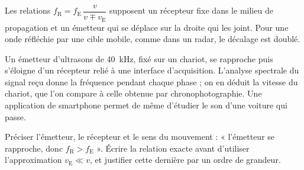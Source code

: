 \begin{attention}
Les relations $f_\mathrm{R}=f_\mathrm{E}\,\dfrac{v}{v\mp v_\mathrm{E}}$ supposent un récepteur fixe dans le milieu de propagation et un
émetteur qui se déplace sur la droite qui les joint. Pour une onde réfléchie par une cible mobile, comme dans un radar,
le décalage est doublé.
\end{attention}
\begin{experience}
Un émetteur d'ultrasons de \qty{40}{kHz}, fixé sur un chariot, se rapproche puis s'éloigne d'un récepteur relié à une
interface d'acquisition. L'analyse spectrale du signal reçu donne la fréquence pendant chaque phase ; on en déduit la
vitesse du chariot, que l'on compare à celle obtenue par chronophotographie. Une application de smartphone permet de
même d'étudier le son d'une voiture qui passe.
\end{experience}
\begin{rediger}
Préciser l'émetteur, le récepteur et le sens du mouvement : « l'émetteur se rapproche, donc $f_\mathrm{R}>f_\mathrm{E}$ ».
Écrire la relation exacte avant d'utiliser l'approximation $v_\mathrm{E}\ll v$, et justifier cette dernière par un ordre de
grandeur.
\end{rediger}
\exercices


